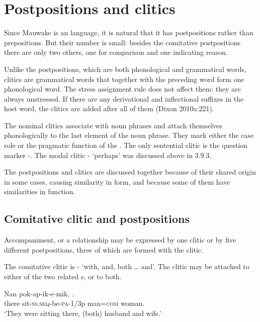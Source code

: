 \section{Postpositions and clitics}
{}
Since Mauwake is an  language, it is natural that it has postpositions rather than prepositions. But their number is small: besides the comitative postpositions there are only two others, one for comparison and one indicating reason.

Unlike the postpositions, which are both phonological and grammatical words, clitics are grammatical words that together with the preceding word form one phonological word. The stress assignment rule does not affect them: they are always unstressed. If there are any derivational and inflectional suffixes in the host word, the clitics are added after all of them (Dixon 2010a:221).

The nominal clitics associate with noun phrases and attach themselves phonologically to the last element of the noun phrase. They mark either the case role or the pragmatic function of the . The only sentential clitic is the question marker \nobreakdash-. The modal clitic - `perhaps' was discussed above in 3.9.3.

The postpositions and clitics are discussed together because of their shared origin in some cases, causing similarity in form, and because some of them have similarities in function.

\subsection{Comitative clitic and postpositions}
{}
Accompaniment, or a relationship may be expressed by one clitic or by five different postpositions, three of which are formed with the clitic. 

The comitative clitic is - `with, and, both {\dots} and'. The clitic may be attached to either of the two related s, or to both.

\ea%
\label{ex:x775}
\gll Nan pok-ap-ik-e-mik,  . \\
there sit-\textsc{ss}.\textsc{seq}-be-\textsc{pa}-1/3p man=\textsc{com} woman.\\
\glt`They were sitting there, (both) husband and wife.'
\z

